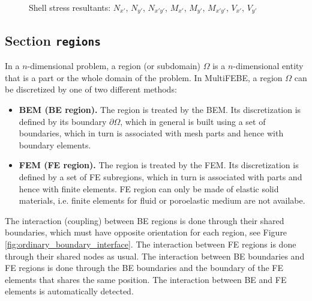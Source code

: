 \documentclass[a4paper,fleqn]{book}
\begin{document}
\begin{figure}[p]
\footnotesize

\caption{Shell stress resultants: $N_{x'}$, $N_{y'}$, $N_{x'y'}$, $M_{x'}$, $M_{y'}$, $M_{x'y'}$, $V_{x'}$, $V_{y'}$}
\label{fig:stress_resultants_shell}
\end{figure}

\subsection{Section \texttt{regions}}
\label{sec:regions}

In a $n$-dimensional problem, a region (or subdomain) $\Omega$ is a $n$-dimensional entity that is a part or the whole domain of the problem. In MultiFEBE, a region $\Omega$ can be discretized by one of two different methods:
\begin{itemize}
  \item \textbf{BEM (BE region).} The region is treated by the BEM. Its discretization is defined by its boundary $\partial\Omega$, which in general is built using a set of boundaries, which in turn is associated with mesh parts and hence with boundary elements.
  \item \textbf{FEM (FE region).} The region is treated by the FEM. Its discretization is defined by a set of FE subregions, which in turn is associated with parts and hence with finite elements. FE region can only be made of elastic solid materials, i.e. finite elements for fluid or poroelastic medium are not availabe.
\end{itemize}
The interaction (coupling) between BE regions is done through their shared boundaries, which must have opposite orientation for each region, see Figure \ref{fig:ordinary_boundary_interface}. The interaction between FE regions is done through their shared nodes as usual. The interaction between BE boundaries and FE regions is done through the BE boundaries and the boundary of the FE elements that shares the same position. The interaction between BE and FE elements is automatically detected.
\end{document}

